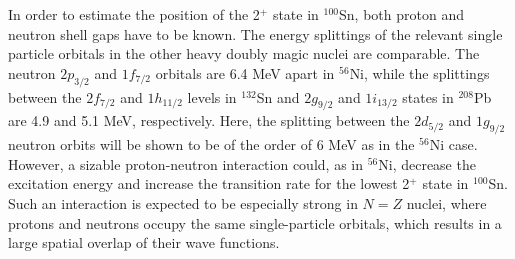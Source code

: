 \documentclass{article}
\begin{document}
In order to estimate the position of the 2$^+$ state in $^{100}$Sn,  
both proton and neutron shell gaps have to be known.
The energy splittings of the relevant single 
particle orbitals in the other heavy doubly magic nuclei are comparable. The 
neutron $2p_{3/2}$ and $1f_{7/2}$ orbitals are 6.4 MeV apart in $^{56}$Ni, 
while the splittings between the $2f_{7/2}$ and $1h_{11/2}$ levels 
in $^{132}$Sn and $2g_{9/2}$ 
and $1i_{13/2}$ states in $^{208}$Pb are 4.9 and 5.1 MeV, respectively.  
Here, the splitting between the $2d_{5/2}$ and $1g_{9/2}$ neutron orbits 
will be shown to be of the order of 6 MeV as in 
the $^{56}$Ni case. However, a sizable proton-neutron
interaction could, as in $^{56}$Ni, decrease the 
excitation energy and increase the transition rate for the lowest 2$^+$ 
state in $^{100}$Sn. Such an interaction is expected to be especially strong 
in $N$$=$$Z$ nuclei, where protons and neutrons occupy the same 
single-particle orbitals, which results in a large spatial
overlap of their wave functions.
\end{document}
